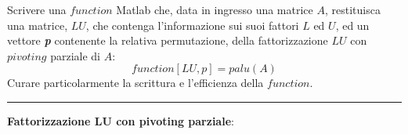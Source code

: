 Scrivere una $function$ Matlab che, data in ingresso una matrice $A$, restituisca una matrice, $LU$, che contenga l’informazione sui suoi fattori $L$ ed $U$, ed un vettore \textit{\textbf{p}} contenente la relativa permutazione, della fattorizzazione $LU$ con $pivoting$ parziale di $A$:
$$function [LU,p] = palu(A)$$
Curare particolarmente la scrittura e l’efficienza della $function$.

\hspace*{\fill}
\par\noindent\rule{\textwidth}{0.4pt}
\hspace*{\fill}

\textbf{Fattorizzazione LU con pivoting parziale}:

